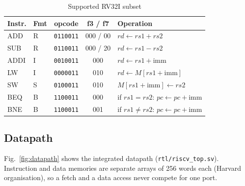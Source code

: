 \documentclass[conference]{IEEEtran}
\newcommand{\code}[1]{\texttt{\small #1}}
\begin{document}
\begin{table}[t]
\centering
\caption{Supported RV32I subset}
\label{tab:isa}
\footnotesize
\begin{tabular}{@{}llccl@{}}
\toprule
Instr. & Fmt & opcode & f3 / f7 & Operation \\
\midrule
ADD  & R & \code{0110011} & 000 / 00 & $rd \leftarrow rs1 + rs2$ \\
SUB  & R & \code{0110011} & 000 / 20 & $rd \leftarrow rs1 - rs2$ \\
ADDI & I & \code{0010011} & 000      & $rd \leftarrow rs1 + \mathrm{imm}$ \\
LW   & I & \code{0000011} & 010      & $rd \leftarrow M[rs1 + \mathrm{imm}]$ \\
SW   & S & \code{0100011} & 010      & $M[rs1 + \mathrm{imm}] \leftarrow rs2$ \\
BEQ  & B & \code{1100011} & 000      & if $rs1 = rs2$: $pc \leftarrow pc + \mathrm{imm}$ \\
BNE  & B & \code{1100011} & 001      & if $rs1 \neq rs2$: $pc \leftarrow pc + \mathrm{imm}$ \\
\bottomrule
\end{tabular}
\end{table}

\subsection{Datapath}
Fig.~\ref{fig:datapath} shows the integrated datapath (\code{rtl/riscv\_top.sv}). Instruction and data memories are separate arrays of 256 words each (Harvard organisation), so a fetch and a data access never compete for one port.
\end{document}
